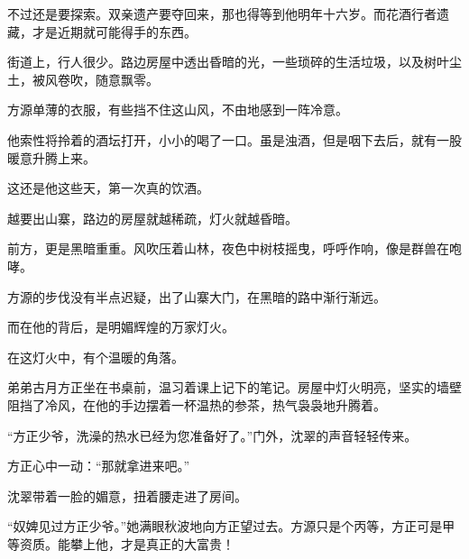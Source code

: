 \begin{this_body}
不过还是要探索。双亲遗产要夺回来，那也得等到他明年十六岁。而花酒行者遗藏，才是近期就可能得手的东西。

街道上，行人很少。路边房屋中透出昏暗的光，一些琐碎的生活垃圾，以及树叶尘土，被风卷吹，随意飘零。

方源单薄的衣服，有些挡不住这山风，不由地感到一阵冷意。

他索性将拎着的酒坛打开，小小的喝了一口。虽是浊酒，但是咽下去后，就有一股暖意升腾上来。

这还是他这些天，第一次真的饮酒。

越要出山寨，路边的房屋就越稀疏，灯火就越昏暗。

前方，更是黑暗重重。风吹压着山林，夜色中树枝摇曳，呼呼作响，像是群兽在咆哮。

方源的步伐没有半点迟疑，出了山寨大门，在黑暗的路中渐行渐远。

而在他的背后，是明媚辉煌的万家灯火。

在这灯火中，有个温暖的角落。

弟弟古月方正坐在书桌前，温习着课上记下的笔记。房屋中灯火明亮，坚实的墙壁阻挡了冷风，在他的手边摆着一杯温热的参茶，热气袅袅地升腾着。

“方正少爷，洗澡的热水已经为您准备好了。”门外，沈翠的声音轻轻传来。

方正心中一动：“那就拿进来吧。”

沈翠带着一脸的媚意，扭着腰走进了房间。

“奴婢见过方正少爷。”她满眼秋波地向方正望过去。方源只是个丙等，方正可是甲等资质。能攀上他，才是真正的大富贵！

\end{this_body}

